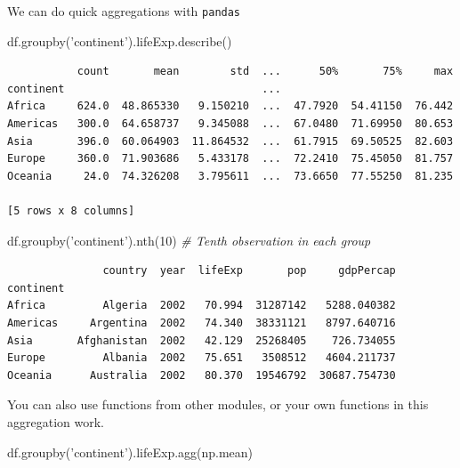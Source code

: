 \documentclass[
  letterpaper,
]{scrbook}
\newenvironment{Shaded}{\begin{snugshade}}{\end{snugshade}}
\newcommand{\CommentTok}[1]{\textcolor[rgb]{0.56,0.35,0.01}{\textit{#1}}}
\newcommand{\DecValTok}[1]{\textcolor[rgb]{0.00,0.00,0.81}{#1}}
\newcommand{\NormalTok}[1]{#1}
\newcommand{\StringTok}[1]{\textcolor[rgb]{0.31,0.60,0.02}{#1}}
\begin{document}
We can do quick aggregations with \texttt{pandas}

\begin{Shaded}
\begin{Highlighting}[]
\NormalTok{df.groupby(}\StringTok{'continent'}\NormalTok{).lifeExp.describe()}
\end{Highlighting}
\end{Shaded}

\begin{verbatim}
           count       mean        std  ...      50%       75%     max
continent                               ...                           
Africa     624.0  48.865330   9.150210  ...  47.7920  54.41150  76.442
Americas   300.0  64.658737   9.345088  ...  67.0480  71.69950  80.653
Asia       396.0  60.064903  11.864532  ...  61.7915  69.50525  82.603
Europe     360.0  71.903686   5.433178  ...  72.2410  75.45050  81.757
Oceania     24.0  74.326208   3.795611  ...  73.6650  77.55250  81.235

[5 rows x 8 columns]
\end{verbatim}

\begin{Shaded}
\begin{Highlighting}[]
\NormalTok{df.groupby(}\StringTok{'continent'}\NormalTok{).nth(}\DecValTok{10}\NormalTok{) }\CommentTok{# Tenth observation in each group}
\end{Highlighting}
\end{Shaded}

\begin{verbatim}
               country  year  lifeExp       pop     gdpPercap
continent                                                    
Africa         Algeria  2002   70.994  31287142   5288.040382
Americas     Argentina  2002   74.340  38331121   8797.640716
Asia       Afghanistan  2002   42.129  25268405    726.734055
Europe         Albania  2002   75.651   3508512   4604.211737
Oceania      Australia  2002   80.370  19546792  30687.754730
\end{verbatim}

You can also use functions from other modules, or your own functions in this aggregation work.

\begin{Shaded}
\begin{Highlighting}[]
\NormalTok{df.groupby(}\StringTok{'continent'}\NormalTok{).lifeExp.agg(np.mean)}
\end{Highlighting}
\end{Shaded}
\end{document}
